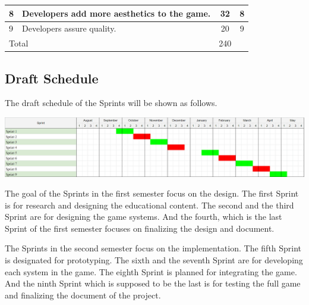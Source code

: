 \documentclass[12pt,oneside,openright,a4paper]{cpe-english-project}
\begin{document}
\begin{table}[!h]
\begin{tabular}{|ll|c|c|}
\multicolumn{1}{|l|}{8}                          & Developers add more aesthetics to the game.                                  & 32                                                                        & 8        \\ \hline
\multicolumn{1}{|l|}{9}                          & Developers assure quality.                                                   & 20                                                                        & 9        \\ \hline
\multicolumn{2}{|l|}{Total}                                                                                                     & 240                                                                       &          \\ \hline
\end{tabular}
\end{table}

\subsection{Draft Schedule}
The draft schedule of the Sprints will be shown as follows.

\begin{minipage}[c]{\textwidth}\centering
\includegraphics[width=16cm]{figure/intro-gantt-chart.png}
\label{fig:intro-gantt-chart}
\end{minipage}

\hspace{2em}The goal of the Sprints in the first semester focus on the design. The first Sprint is for research and designing the educational content. The second and the third Sprint are for designing the game systems. And the fourth, which is the last Sprint of the first semester focuses on finalizing the design and document.

\hspace{2em}The Sprints in the second semester focus on the implementation. The fifth Sprint is designated for prototyping. The sixth and the seventh Sprint are for developing each system in the game. The eighth Sprint is planned for integrating the game. And the ninth Sprint which is supposed to be the last is for testing the full game and finalizing the document of the project.
\end{document}
